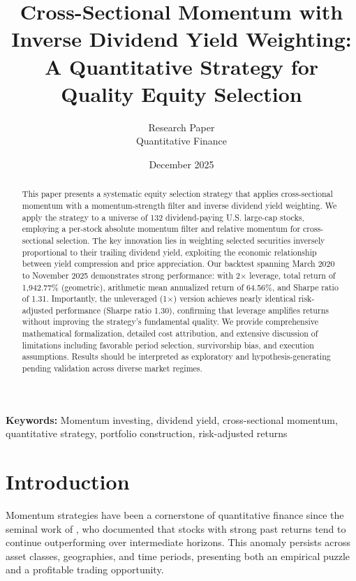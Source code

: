 \documentclass[12pt,a4paper]{article}
\title{\textbf{Cross-Sectional Momentum with Inverse Dividend Yield Weighting: \\
A Quantitative Strategy for Quality Equity Selection}}
\author{
    Research Paper\\
    \small{Quantitative Finance}
}
\date{December 2025}
\theoremstyle{definition}
\begin{document}
\maketitle

\begin{abstract}
This paper presents a systematic equity selection strategy that applies cross-sectional momentum with a momentum-strength filter and inverse dividend yield weighting. We apply the strategy to a universe of 132 dividend-paying U.S. large-cap stocks, employing a per-stock absolute momentum filter and relative momentum for cross-sectional selection. The key innovation lies in weighting selected securities inversely proportional to their trailing dividend yield, exploiting the economic relationship between yield compression and price appreciation. Our backtest spanning March 2020 to November 2025 demonstrates strong performance: with 2$\times$ leverage, total return of 1,942.77\% (geometric), arithmetic mean annualized return of 64.56\%, and Sharpe ratio of 1.31. Importantly, the unleveraged (1$\times$) version achieves nearly identical risk-adjusted performance (Sharpe ratio 1.30), confirming that leverage amplifies returns without improving the strategy's fundamental quality. We provide comprehensive mathematical formalization, detailed cost attribution, and extensive discussion of limitations including favorable period selection, survivorship bias, and execution assumptions. Results should be interpreted as exploratory and hypothesis-generating pending validation across diverse market regimes.
\end{abstract}

\textbf{Keywords:} Momentum investing, dividend yield, cross-sectional momentum, quantitative strategy, portfolio construction, risk-adjusted returns

\newpage
\tableofcontents
\newpage

\section{Introduction}

Momentum strategies have been a cornerstone of quantitative finance since the seminal work of \citet{jegadeesh1993returns}, who documented that stocks with strong past returns tend to continue outperforming over intermediate horizons. This anomaly persists across asset classes, geographies, and time periods, presenting both an empirical puzzle and a profitable trading opportunity.
\end{document}
